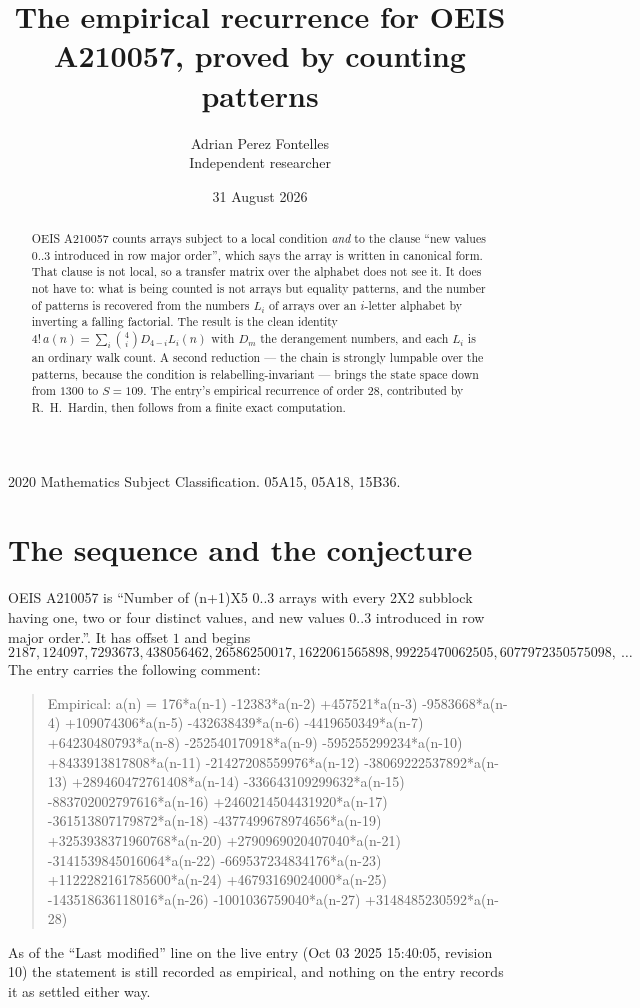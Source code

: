 \documentclass[11pt,a4paper]{article}
\title{The empirical recurrence for OEIS A210057, proved by counting patterns}
\author{Adrian Perez Fontelles\\ \small Independent researcher}
\date{31 August 2026}
\theoremstyle{plain}
\theoremstyle{definition}
\begin{document}
\maketitle

\begin{abstract}
OEIS A210057 counts arrays subject to a local condition \emph{and} to the clause ``new values
$0..3$ introduced in row major order'', which says the array is written in canonical
form. That clause is not local, so a transfer matrix over the alphabet does not see it. It
does not have to: what is being counted is not arrays but equality patterns, and the number
of patterns is recovered from the numbers $L_i$ of arrays over an $i$-letter alphabet by
inverting a falling factorial. The result is the clean identity
$4!\,a(n)=\sum_i\binom{4}{i}D_{4-i}L_i(n)$ with $D_m$ the derangement numbers,
and each $L_i$ is an ordinary walk count. A second reduction --- the chain is strongly
lumpable over the patterns, because the condition is relabelling-invariant --- brings the
state space down from $1300$ to $S=109$. The entry's empirical recurrence of order
$28$, contributed by R.~H.~Hardin, then follows from a finite exact computation.
\end{abstract}

\noindent\small 2020 Mathematics Subject Classification. 05A15, 05A18, 15B36.\normalsize

\section{The sequence and the conjecture}

OEIS A210057 is ``Number of (n+1)X5 0..3 arrays with every 2X2 subblock having one, two or four distinct values, and new values 0..3 introduced in row major order.''. It has offset $1$ and begins
\[
2187, 124097, 7293673, 438056462, 26586250017, 1622061565898, 99225470062505, 6077972350575098,\ \dots
\]
The entry carries the following comment:
\begin{quote}\small
Empirical: a(n) = 176*a(n-1) -12383*a(n-2) +457521*a(n-3) -9583668*a(n-4) +109074306*a(n-5) -432638439*a(n-6) -4419650349*a(n-7) +64230480793*a(n-8) -252540170918*a(n-9) -595255299234*a(n-10) +8433913817808*a(n-11) -21427208559976*a(n-12) -38069222537892*a(n-13) +289460472761408*a(n-14) -336643109299632*a(n-15) -883702002797616*a(n-16) +2460214504431920*a(n-17) -361513807179872*a(n-18) -4377499678974656*a(n-19) +3253938371960768*a(n-20) +2790969020407040*a(n-21) -3141539845016064*a(n-22) -669537234834176*a(n-23) +1122282161785600*a(n-24) +46793169024000*a(n-25) -143518636118016*a(n-26) -1001036759040*a(n-27) +3148485230592*a(n-28)
\end{quote}
As of the ``Last modified'' line on the live entry (Oct 03 2025 15:40:05, revision 10) the statement is
still recorded as empirical, and nothing on the entry records it as settled either way.
\end{document}
